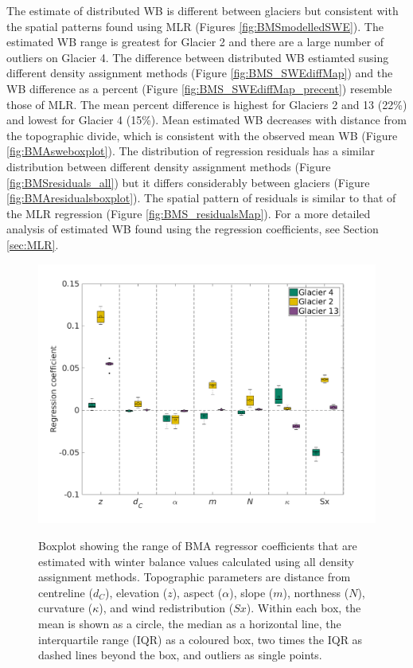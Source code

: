 \documentclass{sfuthesis}
\newcommand{\params}{Topographic parameters are distance from centreline ($d_C$), elevation ($z$), aspect ($\alpha$), slope ($m$), northness ($N$), curvature ($\kappa$), and wind redistribution ($Sx$). }
\newcommand{\boxplot}{Within each box, the mean is shown as a circle, the median as a horizontal line, the interquartile range (IQR) as a coloured box, two times the IQR as dashed lines beyond the box, and outliers as single points. }
\begin{document}
The estimate of distributed WB is different between glaciers but consistent with the spatial patterns found using MLR (Figures \ref{fig:BMSmodelledSWE}). The estimated WB range is greatest for Glacier 2 and there are a large number of outliers on Glacier 4. The difference between distributed WB estiamted susing different density assignment methods (Figure \ref{fig:BMS_SWEdiffMap}) and the WB difference as a percent (Figure \ref{fig:BMS_SWEdiffMap_precent}) resemble those of MLR. The mean percent difference is highest for Glaciers 2 and 13 (22\%) and lowest for Glacier 4 (15\%). Mean estimated WB decreases with distance from the topographic divide, which is consistent with the observed mean WB (Figure \ref{fig:BMAsweboxplot}). The distribution of regression residuals has a similar distribution between different density assignment methods (Figure \ref{fig:BMSresiduals_all}) but it differs considerably between glaciers (Figure \ref{fig:BMAresidualsboxplot}). The spatial pattern of residuals is similar to that of the MLR regression (Figure \ref{fig:BMS_residualsMap}). For a more detailed analysis of estimated WB found using the regression coefficients, see Section \ref{sec:MLR}. 

\begin{figure}[H]
	\centering
	\includegraphics[width =1.1 \textwidth]{BMScoeff_DensityOpts.png}\\
	\caption{Boxplot showing the range of BMA regressor coefficients that are estimated with winter balance values calculated using all density assignment methods. \params \boxplot }
	\label{fig:BMAcoeff_densityOptions}
\end{figure}
\end{document}
